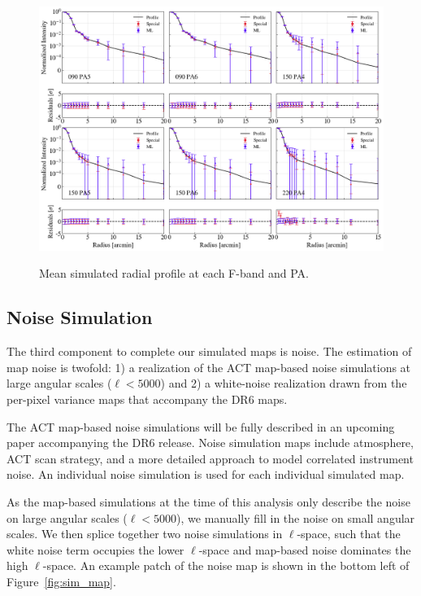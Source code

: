 \begin{figure}[t]
    \centering
    \includegraphics[width=\textwidth]{Figures/profiles_sims.png}
    \label{fig:simprofs}
    \caption{Mean simulated radial profile at each F-band and PA.}
\end{figure}

\subsection{Noise Simulation}
\label{subsec:sim_noise}
The third component to complete our simulated maps is noise.  The estimation of map noise is twofold: 1) a realization of the ACT map-based noise simulations at large angular scales ($\ell<5000$) and 2) a white-noise realization drawn from the per-pixel variance maps that accompany the DR6 maps.

The ACT map-based noise simulations will be fully described in an upcoming paper accompanying the DR6 release. Noise simulation maps include atmosphere, ACT scan strategy, and a more detailed approach to model correlated instrument noise.  An individual noise simulation is used for each individual simulated map.

As the map-based simulations at the time of this analysis only describe the noise on large angular scales ($\ell<5000$), we manually fill in the noise on small angular scales.  We then splice together two noise simulations in $\ell$-space, such that the white noise term occupies the lower $\ell$-space and map-based noise dominates the high $\ell$-space.  An example patch of the noise map is shown in the bottom left of Figure~\ref{fig:sim_map}.

